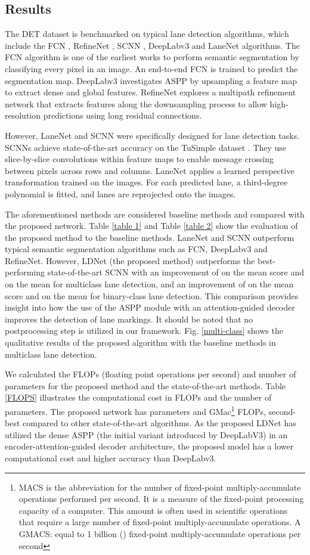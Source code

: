 \documentclass[journal]{IEEEtran}
\begin{document}
\subsection{Results}
The DET dataset is benchmarked on typical lane detection algorithms, which include the FCN \cite{Long2015}, RefineNet \cite{Lin2017}, SCNN \cite{Pan2017}, DeepLabv3 \cite{a4} and LaneNet \cite{Wang2018} algorithms. The FCN algorithm is one of the earliest works to perform semantic segmentation by classifying every pixel in an image. An end-to-end FCN is trained to predict the segmentation map. DeepLabv3 investigates ASPP by upsampling a feature map to extract dense and global features. RefineNet explores a multipath refinement network that extracts features along the downsampling process to allow high-resolution predictions using long residual connections.
\par
However, LaneNet and SCNN were specifically designed for lane detection tasks. SCNNs achieve state-of-the-art accuracy on the TuSimple dataset \cite{tusimple}. They use slice-by-slice convolutions within feature maps to enable message crossing between pixels across rows and columns. LaneNet applies a learned perspective transformation trained on the images. For each predicted lane, a third-degree polynomial is fitted, and lanes are reprojected onto the images.
\par 
The aforementioned methods are considered baseline methods and compared with the proposed network. Table \ref{table 1} and Table \ref{table 2} show the evaluation of the proposed method to the baseline methods. LaneNet and SCNN outperform typical semantic segmentation algorithms such as FCN, DeepLabv3 and RefineNet. However, LDNet (the proposed method) outperforms the best-performing state-of-the-art SCNN with an improvement of  on the mean  score and  on the mean  for multiclass lane detection, and an improvement of  on the mean  score and  on the mean  for binary-class lane detection. This comparison provides insight into how the use of the ASPP module with an attention-guided decoder improves the detection of lane markings. It should be noted that no postprocessing step is utilized in our framework. Fig. \ref{multi-class} shows the qualitative results of the proposed algorithm with the baseline methods in multiclass lane detection.
\par 
 We calculated the FLOPs (floating point operations per second) and number of parameters for the proposed method and the state-of-the-art methods. Table \ref{FLOPS} illustrates the computational cost in FLOPs and the number of parameters.  The proposed network has  parameters and  GMac\footnote{MACS is the abbreviation for the number of fixed-point multiply-accumulate operations performed per second. It is a measure of the fixed-point processing capacity of a computer. This amount is often used in scientific operations that require a large number of fixed-point multiply-accumulate operations.
A GMACS: equal to 1 billion () fixed-point multiply-accumulate operations per second} FLOPs, second-best compared to other state-of-the-art algorithms. As the proposed LDNet has utilized the dense ASPP (the initial variant introduced by DeepLabV3) in an encoder-attention-guided decoder architecture, the proposed model has a lower computational cost and higher accuracy than DeepLabv3. 
\end{document}
